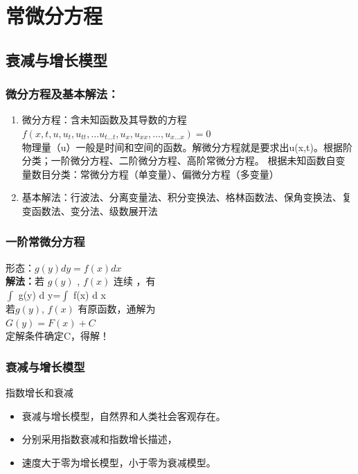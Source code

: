 \section{常微分方程}
\subsection{衰减与增长模型}
\begin{frame}
	\frametitle{微分方程及基本解法：}
    \begin{enumerate}
    \item 微分方程：含未知函数及其导数的方程 \\
    	$f\left(x,t, u, u_t,u_{tt}, \ldots u_{t \ldots t}, u_{x}, u_{xx}, \ldots, u_{x \ldots x} \right)=0$ \\
    	\vspace{0.5cm}
 		物理量（u）一般是时间和空间的函数。解微分方程就是要求出u(x,t)。根据阶分类；一阶微分方程、二阶微分方程、高阶常微分方程。
	 	根据未知函数自变量数目分类：常微分方程（单变量）、偏微分方程（多变量） 
    	\vspace{0.5cm}
    \item 基本解法：行波法、分离变量法、积分变换法、格林函数法、保角变换法、复变函数法、变分法、级数展开法         
    \end{enumerate}
\end{frame}

\begin{frame}
	\frametitle{一阶常微分方程}
	{\large 形态：$g(y)dy=f(x)dx$ }\\ \vspace{0.6cm}
	\textbf{解法：}若 $g(y)$ , $f(x)$ 连续 ，有\\	\vspace{0.3cm}
   	{\large 	$\int$ g(y) d y=$\int$ f(x) d x }\\	\vspace{0.3cm}
	若$g(y)$, $f(x)$  有原函数，通解为\\	\vspace{0.3cm}
	{\large $G(y)=F(x)+C$}\\	\vspace{0.3cm}
	定解条件确定C，得解！
\end{frame}

\begin{frame}
\frametitle{衰减与增长模型}
	\begin{block}{指数增长和衰减}
	\begin{itemize}
		\item 衰减与增长模型，自然界和人类社会客观存在。
		\item 分别采用指数衰减和指数增长描述，
		\item 速度大于零为增长模型，小于零为衰减模型。
	\end{itemize}
	\end{block}
\end{frame}

